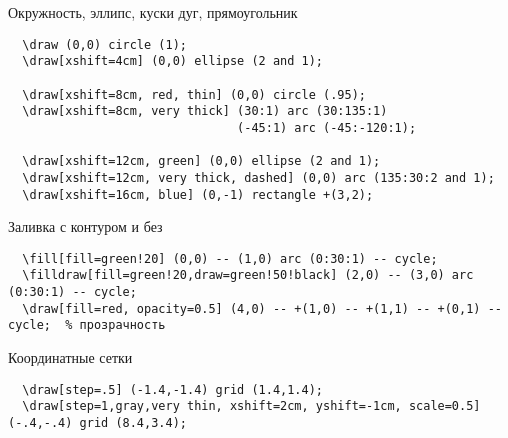 \documentclass[a4paper,12pt]{article}
\begin{document}
Окружность, эллипс, куски дуг, прямоугольник\\
\begin{verbatim}
  \draw (0,0) circle (1);
  \draw[xshift=4cm] (0,0) ellipse (2 and 1);

  \draw[xshift=8cm, red, thin] (0,0) circle (.95);
  \draw[xshift=8cm, very thick] (30:1) arc (30:135:1)
                                (-45:1) arc (-45:-120:1);

  \draw[xshift=12cm, green] (0,0) ellipse (2 and 1);
  \draw[xshift=12cm, very thick, dashed] (0,0) arc (135:30:2 and 1);
  \draw[xshift=16cm, blue] (0,-1) rectangle +(3,2);
\end{verbatim}


\newpage
Заливка с контуром и без
\begin{verbatim}
  \fill[fill=green!20] (0,0) -- (1,0) arc (0:30:1) -- cycle;
  \filldraw[fill=green!20,draw=green!50!black] (2,0) -- (3,0) arc (0:30:1) -- cycle;
  \draw[fill=red, opacity=0.5] (4,0) -- +(1,0) -- +(1,1) -- +(0,1) -- cycle;  % прозрачность
\end{verbatim}


Координатные сетки
\begin{verbatim}
  \draw[step=.5] (-1.4,-1.4) grid (1.4,1.4);
  \draw[step=1,gray,very thin, xshift=2cm, yshift=-1cm, scale=0.5] (-.4,-.4) grid (8.4,3.4);
\end{verbatim}
\end{document}

